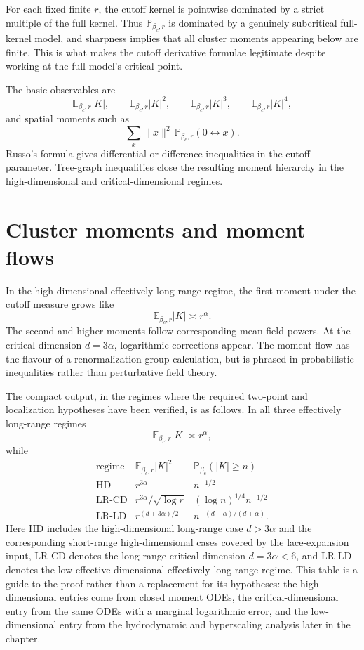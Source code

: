 \documentclass[11pt,reqno]{book}
\numberwithin{equation}{chapter}
\theoremstyle{plain}
\theoremstyle{definition}
\theoremstyle{remark}
\renewcommand{\P}{\mathbb P}
\newcommand{\E}{\mathbb E}
\newcommand{\1}{\mathbf 1}
\newcommand{\norm}[1]{\lVert #1\rVert}
\newcommand{\as}{\asymp}
\begin{document}
For each fixed finite $r$, the cutoff kernel is pointwise dominated by a strict multiple of the full kernel. Thus $\mathbb P_{\beta_c,r}$ is dominated by a genuinely subcritical full-kernel model, and sharpness implies that all cluster moments appearing below are finite. This is what makes the cutoff derivative formulae legitimate despite working at the full model's critical point.

The basic observables are
\[
  \E_{\beta_c,r}|K|,\qquad
  \E_{\beta_c,r}|K|^2,\qquad
  \E_{\beta_c,r}|K|^3,\qquad
  \E_{\beta_c,r}|K|^4,
\]
and spatial moments such as
\[
  \sum_x \norm{x}^{2}\,\mathbb P_{\beta_c,r}(0\leftrightarrow x).
\]
Russo's formula gives differential or difference inequalities in the cutoff parameter. Tree-graph inequalities close the resulting moment hierarchy in the high-dimensional and critical-dimensional regimes.

\section{Cluster moments and moment flows}

In the high-dimensional effectively long-range regime, the first moment under the cutoff measure grows like
\[
  \E_{\beta_c,r}|K|\as r^\alpha.
\]
The second and higher moments follow corresponding mean-field powers. At the critical dimension $d=3\alpha$, logarithmic corrections appear. The moment flow has the flavour of a renormalization group calculation, but is phrased in probabilistic inequalities rather than perturbative field theory.

The compact output, in the regimes where the required two-point and localization hypotheses have been verified, is as follows. In all three effectively long-range regimes
\[
  \E_{\beta_c,r}|K|\asymp r^\alpha,
\]
while
\[
\begin{array}{c|c|c}
\text{regime}
&
\E_{\beta_c,r}|K|^2
&
\P_{\beta_c}(|K|\geq n)
\\ \hline
\mathrm{HD}
&
r^{3\alpha}
&
n^{-1/2}
\\
\mathrm{LR\mbox{-}CD}
&
r^{3\alpha}/\sqrt{\log r}
&
(\log n)^{1/4}n^{-1/2}
\\
\mathrm{LR\mbox{-}LD}
&
r^{(d+3\alpha)/2}
&
n^{-(d-\alpha)/(d+\alpha)} .
\end{array}
\]
Here $\mathrm{HD}$ includes the high-dimensional long-range case $d>3\alpha$ and the corresponding short-range high-dimensional cases covered by the lace-expansion input, $\mathrm{LR\mbox{-}CD}$ denotes the long-range critical dimension $d=3\alpha<6$, and $\mathrm{LR\mbox{-}LD}$ denotes the low-effective-dimensional effectively-long-range regime. This table is a guide to the proof rather than a replacement for its hypotheses: the high-dimensional entries come from closed moment ODEs, the critical-dimensional entry from the same ODEs with a marginal logarithmic error, and the low-dimensional entry from the hydrodynamic and hyperscaling analysis later in the chapter.
\end{document}
